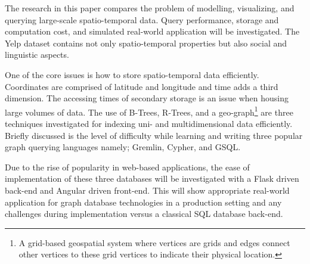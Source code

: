 The research in this paper compares the problem of modelling, visualizing, and querying large-scale spatio-temporal data. Query performance, storage and computation cost, and simulated real-world application will be investigated. The Yelp dataset contains not only spatio-temporal properties but also social and linguistic aspects.

One of the core issues is how to store spatio-temporal data efficiently. Coordinates are comprised of latitude and longitude and time adds a third dimension. The accessing times of secondary storage is an issue when housing large volumes of data. The use of B-Trees, R-Trees, and a geo-graph\footnote{A grid-based geospatial system where vertices are grids and edges connect other vertices to these grid vertices to indicate their physical location.} are three techniques investigated for indexing uni- and multidimensional data efficiently. Briefly discussed is the level of difficulty while learning and writing three popular graph querying languages namely; Gremlin, Cypher, and GSQL.

Due to the rise of popularity in web-based applications, the ease of implementation of these three databases will be investigated with a Flask \cite{flask} driven back-end and Angular \cite{angular} driven front-end. This will show appropriate real-world application for graph database technologies in a production setting and any challenges during implementation versus a classical SQL database back-end.
